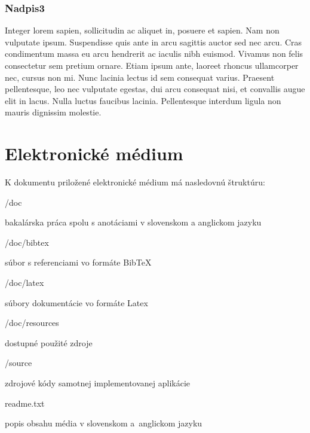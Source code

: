 \subsubsection{Nadpis3}
Integer lorem sapien, sollicitudin ac aliquet in, posuere et sapien. Nam non vulputate ipsum. Suspendisse quis ante in arcu sagittis auctor sed nec arcu. Cras condimentum massa eu arcu hendrerit ac iaculis nibh euismod. Vivamus non felis consectetur sem pretium ornare. Etiam ipsum ante, laoreet rhoncus ullamcorper nec, cursus non mi. Nunc lacinia lectus id sem consequat varius. Praesent pellentesque, leo nec vulputate egestas, dui arcu consequat nisi, et convallis augue elit in lacus. Nulla luctus faucibus lacinia. Pellentesque interdum ligula non mauris dignissim molestie.

\newpage
\section{Elektronické médium}

K dokumentu priložené elektronické médium má nasledovnú štruktúru:
\begin{my_itemize}

\emptyitem /doc
	\begin{my_itemize}
	\myitem bakalárska práca spolu s anotáciami v slovenskom a anglickom jazyku
	\end{my_itemize}

\emptyitem /doc/bibtex
	\begin{my_itemize}
	\myitem súbor s referenciami vo formáte BibTeX
	\end{my_itemize}

\emptyitem /doc/latex
	\begin{my_itemize}
	\myitem súbory dokumentácie vo formáte Latex
	\end{my_itemize}

\emptyitem /doc/resources
	\begin{my_itemize}
	\myitem dostupné použité zdroje
	\end{my_itemize}

\emptyitem /source
	\begin{my_itemize}
	\myitem zdrojové kódy samotnej implementovanej aplikácie
	\end{my_itemize}

\emptyitem readme.txt
	\begin{my_itemize}
    \myitem popis obsahu média v slovenskom a~anglickom jazyku
	\end{my_itemize}
\end{my_itemize}
